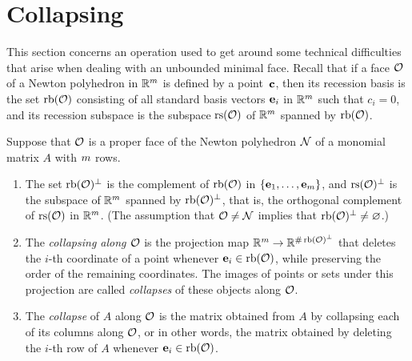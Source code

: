 \documentclass{amsart}
\begin{document}
\section{Collapsing}

This section concerns an operation used to get around some technical difficulties that arise when dealing with an unbounded minimal face.
Recall that if a face $\mathcal{O}$ of a Newton polyhedron in $\mathbb{R}^m$ is defined by a point~$\mathbf{c}$, then its recession basis is the set $\operatorname{rb}(\mathcal{O})$ consisting of all standard basis vectors $\mathbf{e}_i$ in $\mathbb{R}^m$ such that $c_i = 0$, and its recession subspace is the subspace $\operatorname{rs}(\mathcal{O})$ of $\mathbb{R}^m$ spanned by $\operatorname{rb}(\mathcal{O})$.

\begin{definition}[Collapsing]
\label{collapse: D}
 Suppose that $\mathcal{O}$ is a proper face of the Newton polyhedron $\mathcal{N}$ of a monomial matrix $A$ with $m$ rows.

\begin{enumerate}
   \item The set $\operatorname{rb}(\mathcal{O})^{\perp}$ is the complement of $\operatorname{rb}(\mathcal{O})$ in $\{ \mathbf{e}_1, \ldots, \mathbf{e}_m \}$, and $\operatorname{rs}(\mathcal{O})^\perp$ is the subspace of $\mathbb{R}^m$ spanned by $\operatorname{rb}(\mathcal{O})^\perp$, that is, the orthogonal complement of $\operatorname{rs}(\mathcal{O})$ in $\mathbb{R}^m$.
   (The assumption that $\mathcal{O} \neq \mathcal{N}$ implies that $\operatorname{rb}(\mathcal{O})^{\perp} \neq \varnothing$.)
   \item The \emph{collapsing along $\mathcal{O}$} is the projection map $\mathbb{R}^m \to \mathbb{R}^{\#\operatorname{rb}(\mathcal{O})^\perp}$ that deletes the $i$-th coordinate of a point whenever $\mathbf{e}_i \in \operatorname{rb}(\mathcal{O})$, while preserving the order of the remaining coordinates.
   The images of points or sets under this projection are called \emph{collapses} of these objects along $\mathcal{O}$.
   \item The \emph{collapse} of $A$ along $\mathcal{O}$ is the matrix obtained from $A$ by collapsing each of its columns along $\mathcal{O}$, or in other words, the matrix obtained by deleting the $i$-th row of $A$ whenever $\mathbf{e}_i\in \operatorname{rb}(\mathcal{O})$.
\end{enumerate}
\end{definition}
\end{document}
